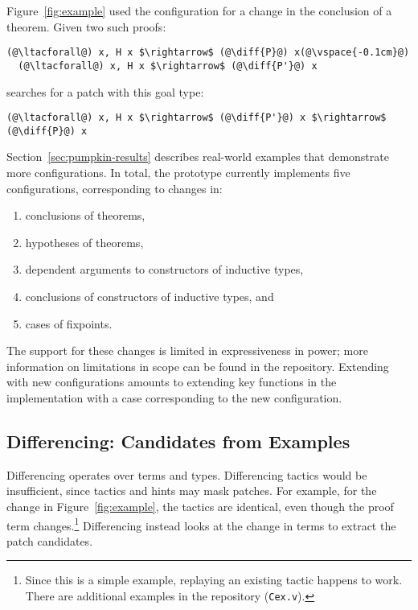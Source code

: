 Figure~\ref{fig:example} used the configuration for a change in the conclusion of a theorem.
Given two such proofs:

\begin{lstlisting}[language=coq]
  (@\ltacforall@) x, H x $\rightarrow$ (@\diff{P}@) x(@\vspace{-0.1cm}@)
  (@\ltacforall@) x, H x $\rightarrow$ (@\diff{P'}@) x
\end{lstlisting}
\sysname searches for a patch with this goal type:

\begin{lstlisting}[language=coq]
  (@\ltacforall@) x, H x $\rightarrow$ (@\diff{P'}@) x $\rightarrow$ (@\diff{P}@) x
\end{lstlisting}

Section~\ref{sec:pumpkin-results} describes real-world examples that demonstrate more configurations.
In total, the \sysname prototype currently implements five configurations, corresponding to changes in:

\begin{enumerate}
\item conclusions of theorems,
\item hypotheses of theorems,
\item dependent arguments to constructors of inductive types, 
\item conclusions of constructors of inductive types, and
\item cases of fixpoints.
\end{enumerate}
The support for these changes is limited in expressiveness in power;
more information on limitations in scope can be found in the repository. %
Extending \sysname with new configurations amounts to extending key functions in the implementation
with a case corresponding to the new configuration.

\subsection{Differencing: Candidates from Examples}
\label{sec:pumpkin-spec-diff}

Differencing operates over terms and types. Differencing tactics
would be insufficient, since tactics and hints may mask patches.
For example, for the change in Figure~\ref{fig:example},
the tactics are identical, even though the proof term changes.\footnote{Since this is a simple example, replaying an existing tactic happens to work. There
are additional examples in the repository (\lstinline{Cex.v}).} %
Differencing instead looks at the change in terms to extract the patch candidates.

